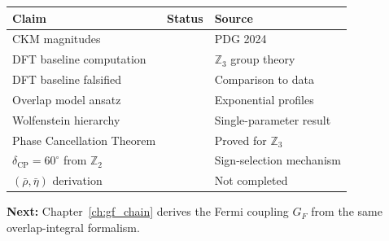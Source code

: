 \begin{tcolorbox}[colback=orange!5, colframe=orange!50!black,
    title=\textbf{Epistemic Audit: Chapter 11}]
\begin{center}
\begin{tabular}{lll}
\toprule
\textbf{Claim} & \textbf{Status} & \textbf{Source} \\
\midrule
CKM magnitudes & \tagBL{} & PDG 2024 \\
DFT baseline computation & \tagDc{} & $\mathbb{Z}_3$ group theory \\
DFT baseline falsified & \tagDc{} & Comparison to data \\
Overlap model ansatz & \tagP{} & Exponential profiles \\
Wolfenstein hierarchy & \tagDc{} & Single-parameter result \\
Phase Cancellation Theorem & \tagDc{} & Proved for $\mathbb{Z}_3$ \\
$\delta_{\text{CP}} = 60^\circ$ from $\mathbb{Z}_2$ & \tagDc{} & Sign-selection mechanism \\
$(\bar\rho, \bar\eta)$ derivation & \tagOpen{} & Not completed \\
\bottomrule
\end{tabular}
\end{center}
\end{tcolorbox}

\textbf{Next:} Chapter~\ref{ch:gf_chain} derives the Fermi coupling $G_F$
from the same overlap-integral formalism.

